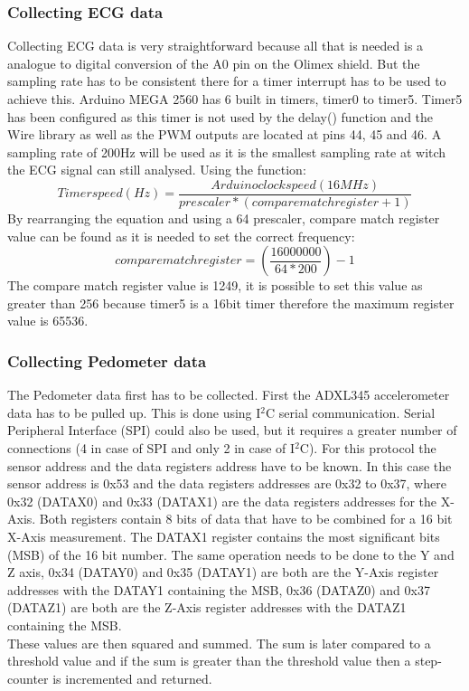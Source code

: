 \documentclass[12pt,]{article}
\numberwithin{figure}{section}
\begin{document}
\subsubsection{Collecting ECG data}
Collecting ECG data is very straightforward because all that is needed is a analogue to digital conversion of the A0 pin on the Olimex shield. But the sampling rate has to be consistent there for a timer interrupt has to be used to achieve this. Arduino MEGA 2560 has 6 built in timers, timer0 to timer5. Timer5 has been configured as this timer is not used by the delay() function and the Wire library as well as the PWM outputs are located at pins 44, 45 and 46.  A sampling rate of 200Hz will be used as it is the smallest sampling rate at witch the ECG signal can still analysed. Using the function:
\begin{equation}
Timer speed(Hz)= \frac{Arduino clock speed (16MHz)}{prescaler*(compare match register+1)}
\end{equation}
By rearranging the equation and using a 64 prescaler, compare match register value can be found as it is needed to set the correct frequency:
\begin{equation}
compare match register=\left(\frac{16000000}{64*200}\right)-1
\end{equation}
The compare match register value is 1249, it is possible to set this value as greater than 256 because timer5 is a 16bit timer therefore the maximum register value is 65536.
\subsubsection{Collecting Pedometer data}
The Pedometer data first has to be collected. First the ADXL345 accelerometer data has to be pulled up. This is done using I$^2$C serial communication. Serial Peripheral Interface (SPI) could also be used, but it requires a greater number of connections (4 in case of SPI and only 2 in case of I$^2$C). For this protocol the sensor address and the data registers address have to be known. In this case the sensor address is 0x53 and the data registers addresses are 0x32 to 0x37, where 0x32 (DATAX0) and 0x33 (DATAX1) are the data registers addresses for the X-Axis. Both registers contain 8 bits of data that have to be combined for a 16 bit X-Axis measurement. The DATAX1 register contains the most significant bits (MSB) of the 16 bit number. The same operation needs to be done to the Y and Z axis, 0x34 (DATAY0) and 0x35 (DATAY1) are both are the Y-Axis register addresses with the DATAY1 containing the MSB, 0x36 (DATAZ0) and 0x37 (DATAZ1) are both are the Z-Axis register addresses with the DATAZ1 containing the MSB.\\
These values are then squared and summed. The sum is later compared to a threshold value and if the sum is greater than the threshold value then a step-counter is incremented and returned.
\end{document}
